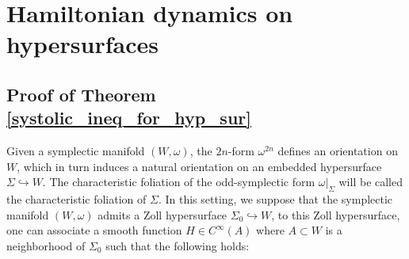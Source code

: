 \documentclass[11pt]{amsart}
\theoremstyle{plain}
\theoremstyle{definition}
\theoremstyle{remark}
\begin{document}
\section{Hamiltonian dynamics on hypersurfaces}\label{dynamics_on_hyp_sec_main}
\subsection{Proof of Theorem \ref{systolic_ineq_for_hyp_sur}}\label{proof_of_hyp_sys_ineq_section}
Given a symplectic manifold $(W,\omega)$, the $2n$-form $\omega^{2n}$ defines an orientation on $W$, which in turn induces a natural orientation on an embedded hypersurface $\Sigma \hookrightarrow W$. The characteristic foliation of the odd-symplectic form $\omega\vert_{\Sigma}$ will be called the characteristic foliation of $\Sigma$. In this setting, we suppose that the symplectic manifold $(W,\omega)$ admits a Zoll hypersurface $\Sigma_0 \hookrightarrow W$, to this Zoll hypersurface, one can associate a smooth function $H \in C^{\infty}(A)$ where $A \subset W$ is a neighborhood of $\Sigma_0$ such that the following holds:
\end{document}
